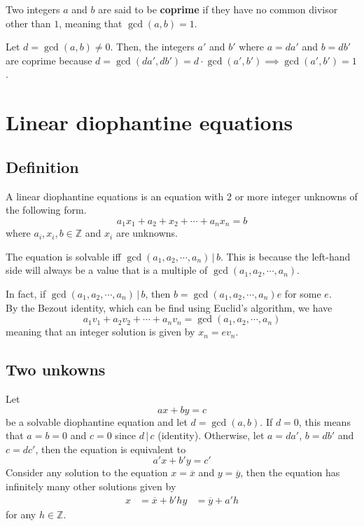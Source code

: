 \documentclass[a4paper]{article}
\newcommand{\divides}{\,|\,}
\begin{document}
Two integers \(a\) and \(b\) are said to be \textbf{coprime}
if they have no common divisor other than \(1\), meaning that \(\gcd(a,b)=1\).

Let \(d = \gcd(a, b) \neq 0\). Then, the integers \(a'\) and \(b'\) where \(a = da'\) and \(b = db'\)
are coprime because \(d = \gcd(da', db') = d\cdot \gcd(a', b') \implies \gcd(a', b') = 1\).


\pagebreak

\section{Linear diophantine equations}

\subsection{Definition}

A linear diophantine equations is an equation with 2 or more integer unknowns of the following form.
\[
    a_1x_1 + a_2+x_2 + \cdots + a_nx_n = b
\]
where \(a_i,x_i,b \in \mathbb{Z}\) and \(x_i\) are unknowns.

The equation is solvable iff \(\gcd(a_1,a_2,\cdots,a_n) \divides b\).
This is because the left-hand side will always be a value that is a multiple
of \(\gcd(a_1,a_2,\cdots,a_n)\).

In fact, if \(\gcd(a_1,a_2,\cdots,a_n) \divides b\),
then \(b = \gcd(a_1,a_2,\cdots,a_n)e\) for some \(e\). \\
By the Bezout identity, which can be find using Euclid's algorithm, we have
\[a_1v_1+a_2v_2+\cdots+a_nv_n=\gcd(a_1,a_2,\cdots,a_n)\]
meaning that an integer solution is given by \(x_n=ev_n\).

\subsection{Two unkowns}

Let \[ax+by=c\] be a solvable diophantine equation
and let \(d = \gcd(a,b)\).
If \(d=0\), this means that \(a=b=0\) and \(c=0\) since \(d \divides c\) (identity).
Otherwise, let \(a=da'\), \(b=db'\) and \(c=dc'\), then the equation is equivalent to
\[
    a'x + b'y = c'
\]
Consider any solution to the equation \(x=\overline{x}\) and \(y=\overline{y}\),
then the equation has infinitely many other solutions given by
\begin{align*}
    x &= \overline{x} + b'h
    y &= \overline{y} + a'h
\end{align*}
for any \(h \in \mathbb{Z}\).
\end{document}
